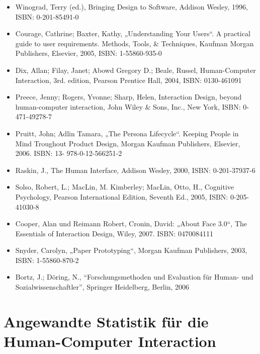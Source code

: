 \begin{itemize}
\tightlist
\item
  Winograd, Terry (ed.), Bringing Design to Software, Addison Wesley,
  1996, ISBN: 0-201-85491-0
\item
  Courage, Cathrine; Baxter, Kathy, „Understanding Your Users``. A
  practical guide to user requirements. Methods, Tools, \& Techniques,
  Kaufman Morgan Publishers, Elsevier, 2005, ISBN: 1-55860-935-0
\item
  Dix, Allan; Filay, Janet; Abowd Gregory D.; Beale, Russel,
  Human-Computer Interaction, 3rd. edition, Pearson Prentice Hall, 2004,
  ISBN: 0130-461091
\item
  Preece, Jenny; Rogers, Yvonne; Sharp, Helen, Interaction Design,
  beyond human-computer interaction, John Wiley \& Sons, Inc., New York,
  ISBN: 0-471-49278-7
\item
  Pruitt, John; Adlin Tamara, „The Persona Lifecycle``. Keeping People
  in Mind Troughout Product Design, Morgan Kaufman Publishers, Elsevier,
  2006. ISBN: 13- 978-0-12-566251-2
\item
  Raskin, J., The Human Interface, Addison Wesley, 2000, ISBN:
  0-201-37937-6
\item
  Solso, Robert, L.; MacLin, M. Kimberley; MacLin, Otto, H., Cognitive
  Psychology, Pearson International Edition, Seventh Ed., 2005, ISBN:
  0-205-41030-8
\item
  Cooper, Alan und Reimann Robert, Cronin, David: „About Face 3.0``, The
  Essentials of Interaction Design, Wiley, 2007. ISBN: 0470084111
\item
  Snyder, Carolyn, „Paper Prototyping``, Morgan Kaufman Publishers,
  2003, ISBN: 1-55860-870-2
\item
  Bortz, J.; Döring, N., ``Forschungsmethoden und Evaluation für Human-
  und Sozialwissenschaftler'', Springer Heidelberg, Berlin, 2006
\end{itemize}

\chapter{Angewandte Statistik für die Human-Computer
Interaction\label{/mi-2017/modulbeschreibungen-master/MA_HCI_Modul_Statistical_Methods_for_HCI}}\label{angewandte-statistik-fuxfcr-die-human-computer-interactionpathlabelmi-2017modulbeschreibungen-mastermaux5fhciux5fmodulux5fstatisticalux5fmethodsux5fforux5fhci}

